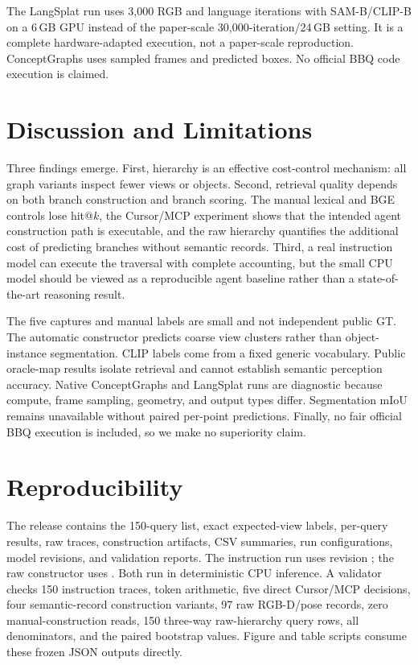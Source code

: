 \documentclass[runningheads]{llncs}
\begin{document}
The LangSplat run uses 3,000 RGB and language iterations with SAM-B/CLIP-B on a
6\,GB GPU instead of the paper-scale 30,000-iteration/24\,GB setting. It is a
complete hardware-adapted execution, not a paper-scale reproduction.
ConceptGraphs uses sampled frames and predicted boxes. No official BBQ code
execution is claimed.

\section{Discussion and Limitations}
Three findings emerge. First, hierarchy is an effective cost-control mechanism:
all graph variants inspect fewer views or objects. Second, retrieval quality
depends on both branch construction and branch scoring. The manual lexical and
BGE controls lose hit@$k$, the Cursor/MCP experiment shows that the intended
agent construction path is executable, and the raw hierarchy quantifies the
additional cost of predicting branches without semantic records. Third, a real
instruction model can execute the traversal with complete accounting, but the
small CPU model should be viewed as a reproducible agent baseline rather than
a state-of-the-art reasoning result.

The five captures and manual labels are small and not independent public GT.
The automatic constructor predicts coarse view clusters rather than
object-instance segmentation. CLIP labels come from a fixed generic
vocabulary. Public oracle-map results isolate retrieval and cannot establish
semantic perception accuracy. Native ConceptGraphs and LangSplat runs are
diagnostic because compute, frame sampling, geometry, and output types differ.
Segmentation mIoU remains unavailable without paired per-point predictions.
Finally, no fair official BBQ execution is included, so we make no superiority
claim.

\section{Reproducibility}
The release contains the 150-query list, exact expected-view labels, per-query
results, raw traces, construction artifacts, CSV summaries, run
configurations, model revisions, and validation reports. The instruction run
uses  revision
; the raw constructor uses
. Both run in deterministic CPU inference.
A validator checks 150 instruction traces, token arithmetic, five direct
Cursor/MCP decisions, four semantic-record construction variants, 97 raw
RGB-D/pose records, zero manual-construction reads, 150 three-way raw-hierarchy
query rows, all denominators, and the paired bootstrap values. Figure and table
scripts consume these frozen JSON outputs directly.
\end{document}
